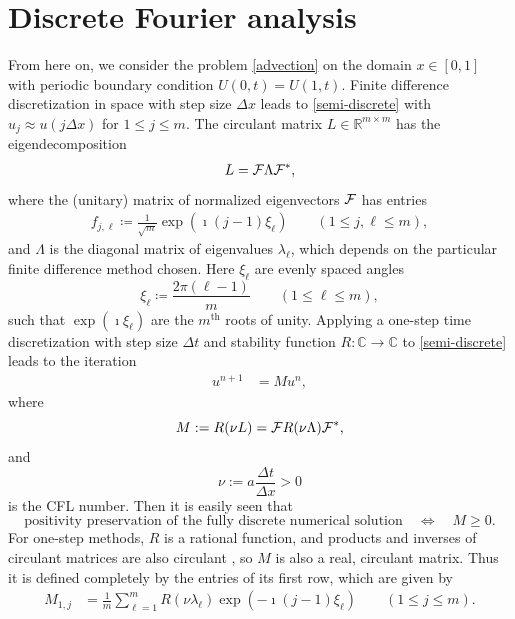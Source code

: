 \documentclass[a4paper]{article}
\newcommand{\dt}{\Delta t}
\newcommand{\dx}{\Delta x}
\newcommand{\cF}{{\cal{F}}}
\begin{document}
\section{Discrete Fourier analysis}\label{sectiondiscFourier}
From here on, we consider the problem \eqref{advection} on the domain $x\in[0,1]$
with periodic boundary condition $U(0,t)=U(1,t)$.  Finite difference discretization
in space with step size $\dx$ leads to \eqref{semi-discrete} with $u_j\approx u(j\dx)$ for $1\le j\le m$. 
The circulant matrix $L\in\mathbb{R}^{m\times m}$ has the eigendecomposition
\begin{align}\label{eigen}
    L  = \cF \Lambda \cF^*,
\end{align}
where the (unitary) matrix of normalized eigenvectors $\cF$ has entries
\begin{align}\label{eigenvectrors}
    f_{j,\ell}  \coloneqq \frac{1}{\sqrt{m}}\exp(\imath  (j-1) \xi_\ell)  \quad\quad (1 \le j, \ell \le m),
\end{align}
and $\Lambda$ is the diagonal matrix of eigenvalues $\lambda_\ell$, which depends on the
particular finite difference method chosen.  Here $\xi_\ell$ are evenly spaced angles 
\begin{equation}\label{xildef}
    \xi_\ell  \coloneqq \frac{2\pi(\ell-1)}{m} \quad\quad (1 \le \ell \le m),
\end{equation}
such that $\exp(\imath\xi_\ell)$ are the $m^\text{th}$ roots of unity.
Applying a one-step time
discretization with step size $\dt$ and stability function $R:\mathbb{C}\to\mathbb{C}$ to \eqref{semi-discrete} leads to
the iteration
\begin{align}\label{M}
    u^{n+1} & = M u^n,
\end{align}
where 
\begin{equation}\label{Mdualdef}
M:=R(\nu L)=\cF R(\nu \Lambda) \cF^*, 
\end{equation}
and 
\begin{equation}\label{nudef}
\nu:=a\frac{\dt}{\dx}>0
\end{equation}
is the CFL number.  
Then it is easily seen that 
\[
\boxed{\text{positivity preservation of the fully discrete numerical solution}\quad \Longleftrightarrow \quad M\ge 0.}
\]
For one-step methods, $R$ is a rational function, and products and inverses of circulant matrices are also circulant \cite[Fact 5.16.7]{matmat}, so
$M$ is also a real, circulant matrix.
Thus it is defined completely by the entries of its first row, which
are given by
\begin{align} \label{M-entries}
    M_{1,j} & = \frac{1}{m} \sum_{\ell=1}^m R(\nu\lambda_\ell) \exp(-\imath(j-1)\xi_\ell) \quad\quad (1\le j\le m).
\end{align}
\end{document}
